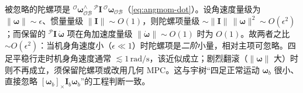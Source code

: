 \begin{derivation}\label{deriv:gyro-order}
被忽略的陀螺项是 ${}^{\mathcal{O}}\boldsymbol{\omega}_{\mathcal{OB}}^{\wedge}\,{}^{\mathcal{P}}\mathbf{I}\,{}^{\mathcal{O}}\boldsymbol{\omega}_{\mathcal{OB}}$（\cref{eq:angmom-dot}）。设角速度量级为 $\|\boldsymbol{\omega}\|\sim\epsilon$、惯量量级 $\|\mathbf{I}\|\sim O(1)$，则陀螺项量级 $\sim\|\mathbf{I}\|\,\|\boldsymbol{\omega}\|^2\sim O(\epsilon^2)$；而保留的 ${}^{\mathcal{P}}\mathbf{I}\,\dot{\boldsymbol{\omega}}$ 项在角加速度量级 $\|\dot{\boldsymbol{\omega}}\|\sim O(1)$ 时为 $O(1)$。故两者之比 $\sim O(\epsilon^2)$：当机身角速度小（$\epsilon\ll1$）时陀螺项是\emph{二阶}小量，相对主项可忽略。四足平稳行走时机身角速度通常 $\lesssim1\,\mathrm{rad/s}$，该近似成立；剧烈翻滚（$\|\boldsymbol{\omega}\|$ 大）时则不再成立，须保留陀螺项或改用几何 MPC\cite{ding2021repfree}。这与宇树“四足正常运动 $\boldsymbol{\omega}_b$ 很小、直接忽略 $[\boldsymbol{\omega}_b]_\times\mathbf{I}_b\boldsymbol{\omega}_b$”的工程判断一致\cite{unitree2023quadruped}。
\end{derivation}
